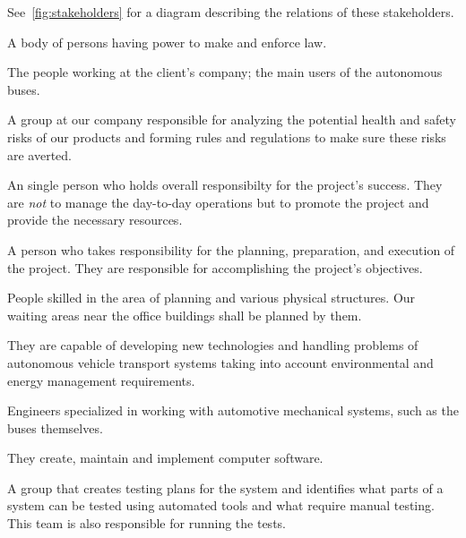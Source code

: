 \documentclass[a4paper]{article}
\begin{document}
See~\cref{fig:stakeholders} for a diagram describing the relations of these
\gls{stakeholder}s.

\begin{description}[style=multiline,align=right,leftmargin=6cm]
	\item[authorities]
		A body of persons having power to make and enforce law.

	\item[office workers]
		The people working at the client's company; the main users of
		the \gls{autonomous} buses.

	\item[Health\&Safety Department]
		A group at our company responsible for analyzing the
		potential health and safety risks of our products and
		forming rules and regulations to make sure these risks
		are averted.

	\item[project sponsor]
		An single person who holds overall responsibilty for the
		project's success. They are \emph{not} to manage the day-to-day
		operations but to promote the project and provide the necessary
		resources.

	\item[project manager]
		A person who takes responsibility for the planning, preparation,
		and execution of the project. They are responsible for
		accomplishing the project's objectives.

	\item[architects]
		People skilled in the area of planning and various physical
		structures. Our waiting areas near the office buildings shall be
		planned by them.

	\item[\gls{autonomous} \gls{vehicle} control engineers]
		They are capable of developing new technologies and handling
		problems of \gls{autonomous} \gls{vehicle} transport systems
		taking into account environmental and energy management
		requirements.

	\item[mechanical engineers]
		Engineers specialized in working with automotive mechanical
		systems, such as the buses themselves.

	\item[software developers]
		They create, maintain and implement computer software.

	\item[system testers]
		A group that creates testing plans for the system and identifies
		what parts of a system can be tested using \gls{automated} tools
		and what require manual testing. This team is also responsible
		for running the tests.


\end{description}
\end{document}
